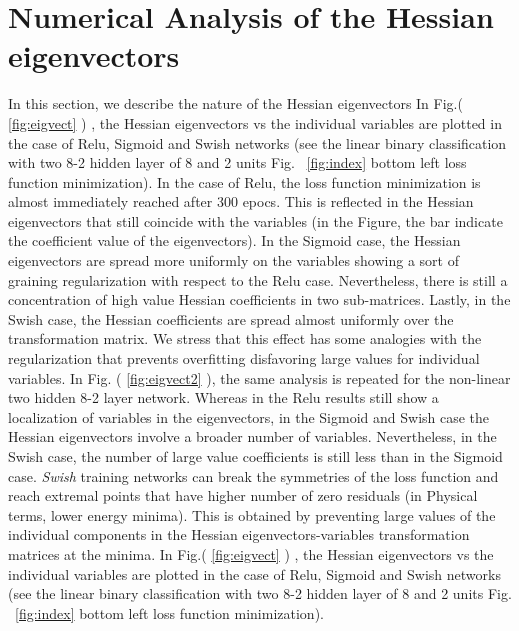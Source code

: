 \documentclass{article}
\begin{document}
\section{Numerical Analysis of the Hessian eigenvectors}
In this section, we describe the nature of the Hessian eigenvectors
In Fig.( \ref{fig:eigvect} ) , the Hessian eigenvectors vs the individual variables are plotted in the case of Relu, Sigmoid and Swish networks (see the linear binary classification with two 8-2 hidden layer of 8 and 2 units Fig. ~\eqref{fig:index} bottom left loss function minimization). In the case of Relu, the loss function minimization is almost immediately reached after 300 epocs. This is reflected in the Hessian eigenvectors that still coincide with the variables (in the Figure, the bar indicate the coefficient value of the eigenvectors). In the Sigmoid case, the Hessian eigenvectors are spread more uniformly on the variables showing a sort of graining regularization with respect to the Relu case. Nevertheless, there is still a concentration of high value Hessian coefficients in two sub-matrices. Lastly, in the Swish case, the Hessian coefficients are spread almost uniformly over the transformation matrix. We stress that this effect has some analogies with the regularization that prevents overfitting disfavoring large values for individual variables.
In Fig. ( \ref{fig:eigvect2} ), the same analysis is repeated for the non-linear two hidden 8-2 layer network. Whereas in the Relu results still show a localization of variables in the eigenvectors, in the Sigmoid and Swish case the Hessian eigenvectors involve a broader number of variables. Nevertheless, in the Swish case, the number of large value coefficients is still less than in the Sigmoid case.
{\it Swish} training networks can break the symmetries of the loss function and reach extremal points that have higher number of zero residuals (in Physical terms, lower energy minima).
This is obtained by preventing large values of the individual components in the Hessian eigenvectors-variables transformation matrices at the minima. In Fig.( \ref{fig:eigvect} ) , the Hessian eigenvectors vs the individual variables are plotted in the case of Relu, Sigmoid and Swish networks (see the linear binary classification with two 8-2 hidden layer of 8 and 2 units Fig. ~\eqref{fig:index} bottom left loss function minimization).
%
%
\end{document}
